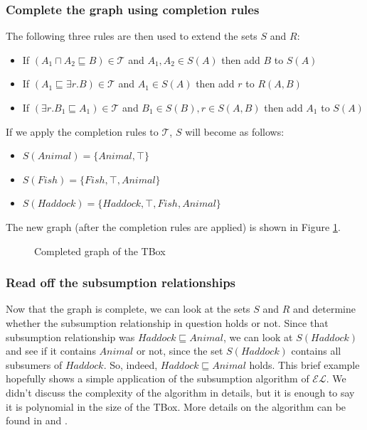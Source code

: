 \subsubsection{Complete the graph using completion rules}
The following three rules are then used to extend the sets $S$ and $R$:
\begin{itemize}
\item If $(A_1 \sqcap A_2 \sqsubseteq B) \in \mathcal{T}$ and $A_1, A_2 \in S(A)$ then add $B$ to $S(A)$
\item If $(A_1 \sqsubseteq \exists r.B) \in \mathcal{T}$ and $A_1 \in S(A)$ then add $r$ to $R(A, B)$
\item If $(\exists r.B_1 \sqsubseteq A_1) \in \mathcal{T}$ and $B_1 \in S(B), r \in S(A, B)$ then add $A_1$ to $S(A)$ 
\end{itemize}
If we apply the completion rules to $\mathcal{T}$, $S$ will become as follows:
\begin{itemize}
\item $S(Animal)= \lbrace Animal, \top \rbrace$
\item $S(Fish)= \lbrace Fish, \top, Animal \rbrace$
\item $S(Haddock) = \lbrace Haddock, \top, Fish, Animal \rbrace$
\end{itemize}
The new graph (after the completion rules are applied) is shown in Figure \ref{hdk-complete}. 

\begin{figure}
\centering
{}
\caption{Completed graph of the TBox}
\label{hdk-complete}
\end{figure}

\subsubsection{Read off the subsumption relationships}
Now that the graph is complete, we can look at the sets $S$ and $R$ and determine whether the subsumption relationship in question holds or not. Since that subsumption relationship was $Haddock \sqsubseteq Animal$, we can look at $S(Haddock)$ and see if it contains $Animal$ or not, since the set $S(Haddock)$ contains all subsumers of $Haddock$. So, indeed, $Haddock \sqsubseteq Animal$ holds. This brief example hopefully shows a simple application of the subsumption algorithm of $\mathcal{EL}$. We didn't discuss the complexity of the algorithm in details, but it is enough to say it is polynomial in the size of the TBox. More details on the algorithm can be found in \cite{small} and \cite{new}.

